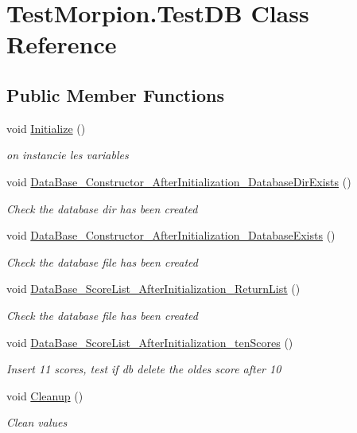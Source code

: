 \hypertarget{class_test_morpion_1_1_test_d_b}{}\section{Test\+Morpion.\+Test\+DB Class Reference}
\label{class_test_morpion_1_1_test_d_b}
\subsection*{Public Member Functions}
\begin{DoxyCompactItemize}
\item 
void \hyperlink{class_test_morpion_1_1_test_d_b_a4ac592a6b2dc14e87feb0154285126b4}{Initialize} ()
\begin{DoxyCompactList}\small\item\em on instancie les variables \end{DoxyCompactList}\item 
void \hyperlink{class_test_morpion_1_1_test_d_b_af72bbca8de5f0132a979983e1a562e9b}{Data\+Base\+\_\+\+Constructor\+\_\+\+After\+Initialization\+\_\+\+Database\+Dir\+Exists} ()
\begin{DoxyCompactList}\small\item\em Check the database dir has been created \end{DoxyCompactList}\item 
void \hyperlink{class_test_morpion_1_1_test_d_b_a19357f8672f88f76e209925f311bbeb2}{Data\+Base\+\_\+\+Constructor\+\_\+\+After\+Initialization\+\_\+\+Database\+Exists} ()
\begin{DoxyCompactList}\small\item\em Check the database file has been created \end{DoxyCompactList}\item 
void \hyperlink{class_test_morpion_1_1_test_d_b_aa0e09de9242070ffcdf4db726d75e611}{Data\+Base\+\_\+\+Score\+List\+\_\+\+After\+Initialization\+\_\+\+Return\+List} ()
\begin{DoxyCompactList}\small\item\em Check the database file has been created \end{DoxyCompactList}\item 
void \hyperlink{class_test_morpion_1_1_test_d_b_a0b5f789271b53818bc9b546e14e9346f}{Data\+Base\+\_\+\+Score\+List\+\_\+\+After\+Initialization\+\_\+ten\+Scores} ()
\begin{DoxyCompactList}\small\item\em Insert 11 scores, test if db delete the oldes score after 10 \end{DoxyCompactList}\item 
void \hyperlink{class_test_morpion_1_1_test_d_b_abcd0e22acda3b5e66e9ecf5e2bc674cc}{Cleanup} ()
\begin{DoxyCompactList}\small\item\em Clean values \end{DoxyCompactList}\end{DoxyCompactItemize}


